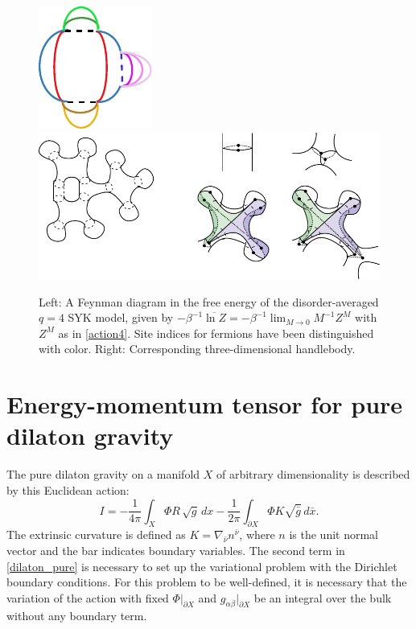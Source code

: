 \documentclass[12pt]{article}
\begin{document}
\begin{figure}[t]
\centering
\includegraphics[scale=1]{Feynman.pdf}\qquad \qquad \includegraphics[scale=0.63]{handlebody.pdf}
\centering
\caption{Left: A Feynman diagram in the free energy of the disorder-averaged $q=4$ SYK model, given by $-\beta^{-1} \overline{\ln Z}=-\beta^{-1}\lim_{M \to 0}M^{-1}Z^M$ with $Z^M$ as in \eqref{action4}. Site indices for fermions have been distinguished with color. Right: Corresponding three-dimensional handlebody.}\label{fig: handlebody}
\end{figure}

\section{Energy-momentum tensor for pure dilaton gravity}\label{sec_pure_dilaton}

The pure dilaton gravity on a manifold $X$ of arbitrary dimensionality is described by this Euclidean action:
\begin{equation}\label{dilaton_pure}
I=-\frac{1}{4\pi}\int_{X} \Phi R\,\sqrt{g}\,dx
-\frac{1}{2\pi}\int_{\partial X}\Phi K\sqrt{\bar{g}}\,d\bar{x}.
\end{equation}
The extrinsic curvature is defined as $K=\nabla_{\bar{\nu}}n^{\bar{\nu}}$, where $n$ is the unit normal vector and the bar indicates boundary variables. The second term in \eqref{dilaton_pure} is necessary to set up the variational problem with the Dirichlet boundary conditions. For this problem to be well-defined, it is necessary that the variation of the action with fixed $\Phi|_{\partial X}$ and $g_{\alpha\beta}|_{\partial X}$ be an integral over the bulk without any boundary term.
\end{document}
